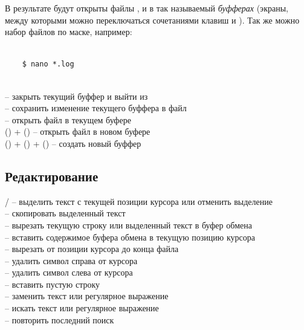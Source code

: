 В результате будут открыты файлы ,  и  в так называемый \textit{буфферах} (экраны, между которыми можно переключаться сочетаниями клавиш  и ). Так же можно набор файлов по маске, например:
\begin{lstlisting}
	
	$ nano *.log
	
\end{lstlisting}	

\noindent
{} -- закрыть текущий буффер и выйти из \\
 -- сохранить изменение текущего буффера в файл\\
 -- открыть файл в текущем буфере\\
()  + () -- открыть файл в новом буфере\\
()  + () + () -- создать новый буффер\\


\subsection*{Редактирование}
\noindent
{}/ -- выделить текст с текущей позиции курсора или отменить выделение\\
 -- скопировать выделенный текст\\
 -- вырезать текущую строку или выделенный текст в буфер обмена\\
 -- вставить содержимое буфера обмена в текущую позицию курсора\\
 -- вырезать от позиции курсора до конца файла\\
 -- удалить символ справа от курсора\\
 -- удалить символ слева от курсора\\
 -- вставить пустую строку\\
 -- заменить текст или регулярное выражение\\
 -- искать текст или регулярное выражение\\
 -- повторить последний поиск\\

